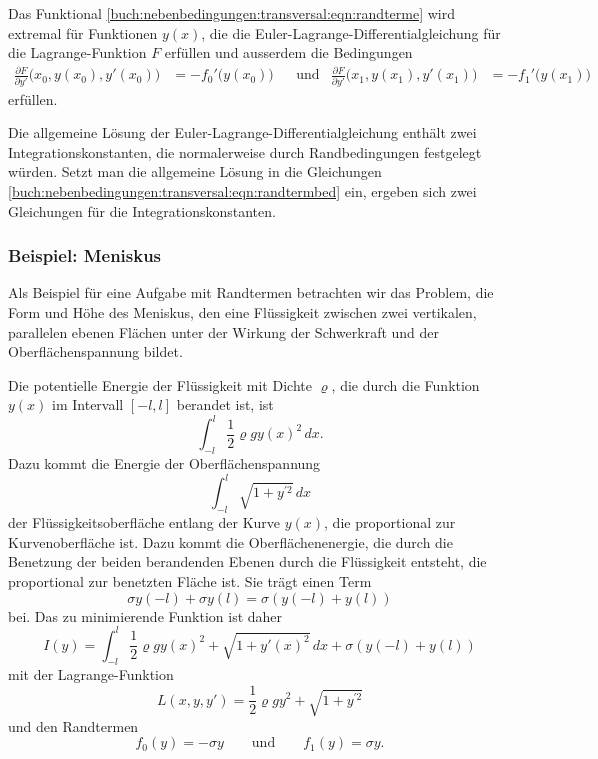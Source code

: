 \begin{satz}
\label{buch:nebenbedingungen:transversal:satz:randterme}
Das Funktional
\eqref{buch:nebenbedingungen:transversal:eqn:randterme}
wird extremal für Funktionen $y(x)$, die die
Euler-La\-gran\-ge-Differentialgleichung für die Lagrange-Funktion $F$ erfüllen
und ausserdem die Bedingungen
\begin{align}
\frac{\partial F}{\partial y'}\bigl(x_0,y(x_0),y'(x_0)) &= -f_0'(y(x_0)\bigr)
&&\text{und}&
\frac{\partial F}{\partial y'}\bigl(x_1,y(x_1),y'(x_1)) &= -f_1'(y(x_1)\bigr)
\label{buch:nebenbedingungen:transversal:eqn:randtermbed}
\end{align}
erfüllen.
\end{satz}

Die allgemeine Lösung der Euler-Lagrange-Differentialgleichung
enthält zwei Integrationskonstanten, die normalerweise durch
Randbedingungen festgelegt würden.
Setzt man die allgemeine Lösung in die Gleichungen
\eqref{buch:nebenbedingungen:transversal:eqn:randtermbed}
ein, ergeben sich zwei Gleichungen für die Integrationskonstanten.

%
%
\subsubsection{Beispiel: Meniskus}
%
Als Beispiel für eine Aufgabe mit Randtermen betrachten wir das
Problem, die Form und Höhe des Meniskus, den eine Flüssigkeit zwischen
zwei vertikalen, parallelen ebenen Flächen unter der Wirkung der
Schwerkraft und der Oberflächenspannung bildet.
%
%

Die potentielle Energie der Flüssigkeit mit Dichte $\varrho$, die 
%
durch die Funktion $y(x)$ im Intervall $[-l,l]$ berandet ist, ist
\[
\int_{-l}^l
\frac12
\varrho
g
y(x)^2
\,dx.
\]
Dazu kommt die Energie der Oberflächenspannung
\[
\int_{-l}^l \sqrt{1+y^{\prime 2}}\,dx
\]
der Flüssigkeitsoberfläche entlang der Kurve $y(x)$, die 
proportional zur Kurvenoberfläche ist.
Dazu kommt die Oberflächenenergie, die durch die Benetzung der
beiden berandenden Ebenen durch die Flüssigkeit entsteht, die
proportional zur benetzten Fläche ist. 
Sie trägt einen Term
\[
\sigma y(-l) + \sigma y(l)
=
\sigma(y(-l)+y(l))
\]
bei.
Das zu minimierende Funktion ist daher
\[
I(y)
=
\int_{-l}^l
\frac12\varrho g y(x)^2
+
\sqrt{1+y'(x)^2}
\,dx
+
\sigma(y(-l)+y(l))
\]
mit der Lagrange-Funktion
\[
L(x,y,y')
=
\frac12\varrho g y^2
+
\sqrt{1+y^{\prime 2}}
\]
und den Randtermen
\[
f_0(y) = -\sigma y
\qquad\text{und}\qquad
f_1(y) = \sigma y.
\]

